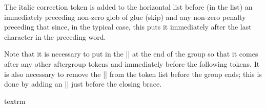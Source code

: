     The italic correction token is added to the horizontal list
    before (in the list) an immediately preceding non-zero glob of
    glue (skip) and any non-zero penalty preceding that since, in
    the typical case, this puts it immediately
    after the last character in the preceding word.

    Note that it is necessary to put in the |\aftergroup\maybe@ic| at
    the end of the group so that it comes after any other aftergroup
    tokens and immediately before the following tokens.
    It is also necessary to remove the |\fi| from the token list before
    the group ends; this is done by adding an |\expandafter| just
    before the closing brace.
%
\begin{teX}
\def \DeclareTextFontCommand #1#2{%
  \DeclareRobustCommand#1[1]{%
    \ifmmode
      \nfss@text{#2##1}%
    \else
      \hmode@bgroup
       \text@command{##1}%
       #2\check@icl ##1\check@icr
       \expandafter
      \egroup
    \fi
  }%
}
\end{teX}

%
\begin{docCmd}{textrm}{}
\begin{teX}
\DeclareTextFontCommand{\textrm}{\rmfamily}
\end{teX}
\end{docCmd}

